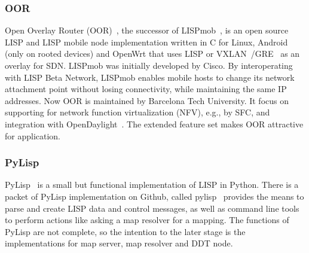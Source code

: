 \subsubsection{OOR}
\label{subsubsec:implementation_oor}
Open Overlay Router (OOR)~\cite{OOR}, the successor of LISPmob~\cite{cabellos2011lispmob}, is an open source LISP and LISP mobile node implementation written in C for Linux, Android (only on rooted devices) and OpenWrt that uses LISP or VXLAN~\cite{mahalingam2014virtual}/GRE~\cite{hanks2000generic} as an overlay for SDN. LISPmob was initially developed by Cisco. By interoperating with LISP Beta Network, LISPmob enables mobile hosts to change its network attachment point without losing connectivity, while maintaining the same IP addresses. Now OOR is maintained by Barcelona Tech University. It focus on supporting for network function virtualization (NFV), e.g., by SFC, and integration with OpenDaylight~\cite{OpenDaylight}. The extended feature set makes OOR attractive for application.



\subsubsection{PyLisp}
\label{subsubsec:implementation_pylisp}
PyLisp~\cite{pylisp} is a small but functional implementation of LISP in Python. There is a packet of PyLisp implementation on Github, called pylisp~\cite{pylispgithub} provides the means to parse and create LISP data and control messages, as well as command line tools to perform actions like asking a map resolver for a mapping. The functions of PyLisp are not complete, so the intention to the later stage is the implementations for map server, map resolver and DDT node.


